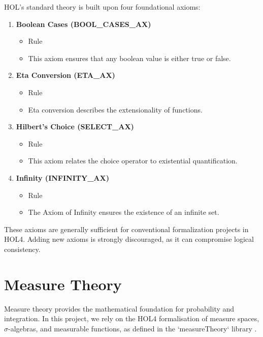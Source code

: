 HOL’s standard theory is built upon four foundational axioms:
\begin{enumerate}
    \item \textbf{Boolean Cases (BOOL\_CASES\_AX)}
    \begin{itemize}
        \item Rule
        \item This axiom ensures that any boolean value is either true or false.
    \end{itemize}

    \item \textbf{Eta Conversion (ETA\_AX)}
    \begin{itemize}
        \item Rule
        \item Eta conversion describes the extensionality of functions.
    \end{itemize}

    \item \textbf{Hilbert’s Choice (SELECT\_AX)}
    \begin{itemize}
        \item Rule
        \item This axiom relates the choice operator to existential quantification.
    \end{itemize}

    \item \textbf{Infinity (INFINITY\_AX)}
    \begin{itemize}
        \item Rule
        \item The Axiom of Infinity ensures the existence of an infinite set.
    \end{itemize}

\end{enumerate}

These axioms are generally sufficient for conventional formalization projects in HOL4. Adding new axioms is strongly discouraged, as it can compromise logical consistency.

\section{Measure Theory}

Measure theory provides the mathematical foundation for probability and integration. In this project, we rely on the HOL4 formalisation of measure spaces, $\sigma$-algebras, and measurable functions, as defined in the `measureTheory` library \cite{hol4}.


